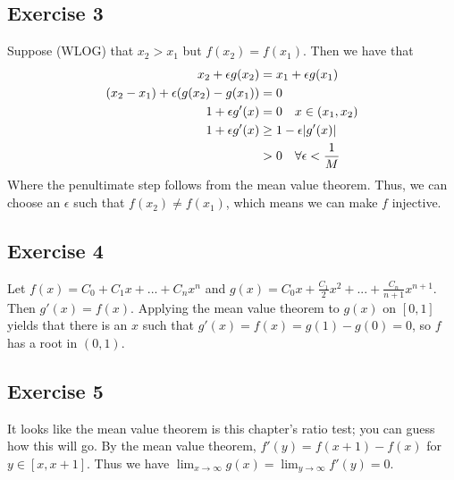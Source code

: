 \subsection{Exercise 3}
Suppose (WLOG) that $x_2 > x_1$ but $f(x_2) = f(x_1)$. Then we have that
\begin{align*}
        x_2 + \epsilon g(x_2) &= x_1 + \epsilon g(x_1) \\
        (x_2 - x_1) + \epsilon (g(x_2) - g(x_1)) &= 0 \\
        1 + \epsilon g'(x) &= 0 \quad x \in (x_1, x_2) \\
        1 + \epsilon g'(x) &\geq 1 - \epsilon \abs{g'(x)} \\
                           &> 0 \quad \forall \epsilon < \frac{1}{M}
\end{align*}
Where the penultimate step follows from the mean value theorem.
Thus, we can choose an $\epsilon$ such that $f(x_2) \neq f(x_1)$, which means we can make $f$ injective.

\subsection{Exercise 4}
Let $f(x) = C_0 + C_1 x + ... + C_n x^n$ and $g(x) = C_0 x + \frac{C_1}{2} x^2 + ... + \frac{C_n}{n+1}x^{n+1}$.
Then $g'(x) = f(x)$. Applying the mean value theorem to $g(x)$ on $[0, 1]$ yields that there is an $x$ 
such that $g'(x) = f(x) = g(1) - g(0) = 0$, so $f$ has a root in $(0, 1)$.

\subsection{Exercise 5}
It looks like the mean value theorem is this chapter's ratio test; you can guess how this will go.
By the mean value theorem, $f'(y) = f(x + 1) - f(x)$ for $y \in [x, x+1]$. Thus we have
$\lim_{x \to \infty} g(x) = \lim_{y \to \infty} f'(y) = 0$.
